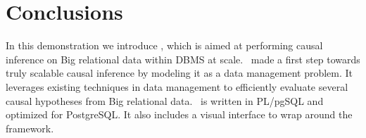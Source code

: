 
\section{Conclusions}
In this demonstration we introduce \GSQL, which is aimed at
performing causal inference
on Big relational data within DBMS at scale. \GSQL\ made a first step towards truly scalable causal inference by modeling it as a data management problem. It leverages existing techniques
in data management to efficiently evaluate several causal hypotheses from Big relational data. \GSQL\ is written in PL/pgSQL and optimized for PostgreSQL. It also includes a visual interface to wrap around the framework.
